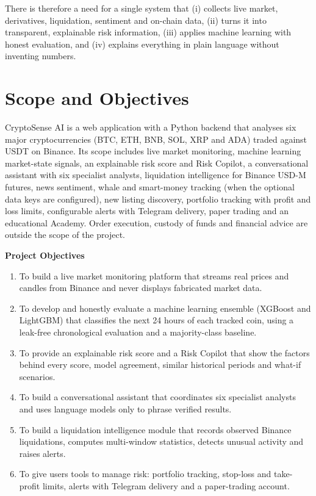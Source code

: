There is therefore a need for a single system that (i) collects live market, derivatives, liquidation, sentiment and on-chain data, (ii) turns it into transparent, explainable risk information, (iii) applies machine learning with honest evaluation, and (iv) explains everything in plain language without inventing numbers.

\section{Scope and Objectives}
CryptoSense AI is a web application with a Python backend that analyses six major cryptocurrencies (BTC, ETH, BNB, SOL, XRP and ADA) traded against USDT on Binance. Its scope includes live market monitoring, machine learning market-state signals, an explainable risk score and Risk Copilot, a conversational assistant with six specialist analysts, liquidation intelligence for Binance USD-M futures, news sentiment, whale and smart-money tracking (when the optional data keys are configured), new listing discovery, portfolio tracking with profit and loss limits, configurable alerts with Telegram delivery, paper trading and an educational Academy. Order execution, custody of funds and financial advice are outside the scope of the project.

\textbf{Project Objectives}
\begin{enumerate}[label=PO\arabic*]
\item To build a live market monitoring platform that streams real prices and candles from Binance and never displays fabricated market data.
\item To develop and honestly evaluate a machine learning ensemble (XGBoost and LightGBM) that classifies the next 24 hours of each tracked coin, using a leak-free chronological evaluation and a majority-class baseline.
\item To provide an explainable risk score and a Risk Copilot that show the factors behind every score, model agreement, similar historical periods and what-if scenarios.
\item To build a conversational assistant that coordinates six specialist analysts and uses language models only to phrase verified results.
\item To build a liquidation intelligence module that records observed Binance liquidations, computes multi-window statistics, detects unusual activity and raises alerts.
\item To give users tools to manage risk: portfolio tracking, stop-loss and take-profit limits, alerts with Telegram delivery and a paper-trading account.
\end{enumerate}


